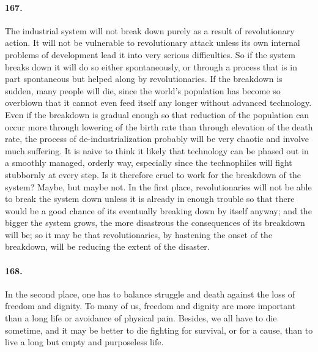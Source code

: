 \documentclass[12pt]{book}
\begin{document}
\paragraph{167.} The industrial system will not break down purely as a result of revolutionary action. It will not be vulnerable to revolutionary attack unless its own internal problems of development lead it into very serious difficulties. So if the system breaks down it will do so either spontaneously, or through a process that is in part spontaneous but helped along by revolutionaries. If the breakdown is sudden, many people will die, since the world's population has become so overblown that it cannot even feed itself any longer without advanced technology. Even if the breakdown is gradual enough so that reduction of the population can occur more through lowering of the birth rate than through elevation of the death rate, the process of de-industrialization probably will be very chaotic and involve much suffering.  It is naive to think it likely that technology can be phased out in a smoothly managed, orderly way, especially since the technophiles will fight stubbornly at every step. Is it therefore cruel to work for the breakdown of the system?  Maybe, but maybe not. In the first place, revolutionaries will not be able to break the system down unless it is already in enough trouble so that there would be a good chance of its eventually breaking down by itself anyway; and the bigger the system grows, the more disastrous the consequences of its breakdown will be; so it may be that revolutionaries, by hastening the onset of the breakdown, will be reducing the extent of the disaster.


\paragraph{168.}  In the second place, one has to balance struggle and death against the loss of freedom and dignity. To many of us, freedom and dignity are more important than a long life or avoidance of physical pain. Besides, we all have to die sometime, and it may be better to die fighting for survival, or for a cause, than to live a long but empty and purposeless life.
\end{document}

